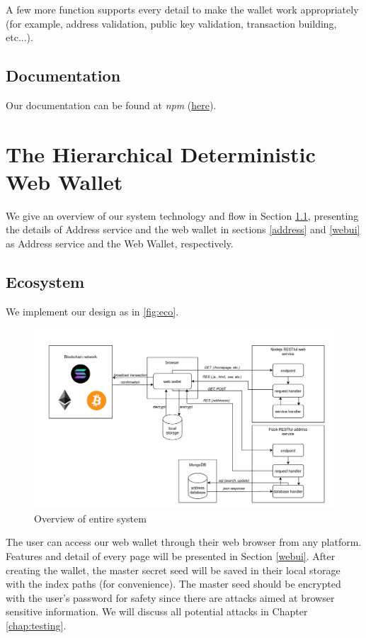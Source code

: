 A few more function supports every detail to make the wallet work appropriately (for example, address validation, public key validation, transaction building, etc...).


\subsection{Documentation}
Our documentation can be found at \textit{npm} ({\href{https://www.npmjs.com/package/hdcore-ts}{here}}).


\section{The Hierarchical Deterministic Web Wallet}

We give an overview of our system technology and flow in Section \ref{echo}, presenting the details of Address service and the web wallet in sections \ref{address} and \ref{webui} as Address service and the Web Wallet, respectively.

\subsection{Ecosystem}
\label{echo}

We implement our design as in \autoref{fig:eco}.

\begin{figure}[ht!]
    \centering
    \includegraphics[width=1\textwidth]{images/ecosystem.png}
    \caption[Overview of entire system]{Overview of entire system}
    \label{fig:eco}
\end{figure}

The user can access our web wallet through their web browser from any platform. Features and detail of every page will be presented in Section \ref{webui}. After creating the wallet, the master secret seed will be saved in their local storage with the index paths  (for convenience). The master seed should be encrypted with the user’s password for safety since there are attacks aimed at browser sensitive information. We will discuss all potential attacks in Chapter \ref{chap:testing}.


